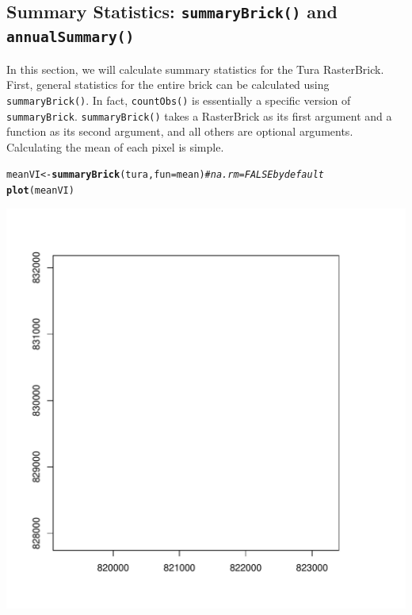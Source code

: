 \documentclass{article}\usepackage[]{graphicx}\usepackage[]{color}
\makeatletter
\def\maxwidth{ %
  \ifdim\Gin@nat@width>\linewidth
    \linewidth
  \else
    \Gin@nat@width
  \fi
}
\newcommand{\hlcom}[1]{\textcolor[rgb]{0.678,0.584,0.686}{\textit{#1}}}%
\newcommand{\hlstd}[1]{\textcolor[rgb]{0.345,0.345,0.345}{#1}}%
\newcommand{\hlkwb}[1]{\textcolor[rgb]{0.69,0.353,0.396}{#1}}%
\newcommand{\hlkwc}[1]{\textcolor[rgb]{0.333,0.667,0.333}{#1}}%
\newcommand{\hlkwd}[1]{\textcolor[rgb]{0.737,0.353,0.396}{\textbf{#1}}}%
\newenvironment{kframe}{%
 \def\at@end@of@kframe{}%
 \ifinner\ifhmode%
  \def\at@end@of@kframe{\end{minipage}}%
  \begin{minipage}{\columnwidth}%
 \fi\fi%
 \def\FrameCommand##1{\hskip\@totalleftmargin \hskip-\fboxsep
 \colorbox{shadecolor}{##1}\hskip-\fboxsep
     \hskip-\linewidth \hskip-\@totalleftmargin \hskip\columnwidth}%
 \MakeFramed {\advance\hsize-\width
   \@totalleftmargin\z@ \linewidth\hsize
   \@setminipage}}%
 {\par\unskip\endMakeFramed%
 \at@end@of@kframe}
\newenvironment{knitrout}{}{} %
\def\code#1{\texttt{#1}}
\makeatother
\begin{document}
\subsection{Summary Statistics: \code{summaryBrick()} and \code{annualSummary()}}

In this section, we will calculate summary statistics for the Tura RasterBrick. First, general statistics for the entire brick can be calculated using \code{summaryBrick()}. In fact, \code{countObs()} is essentially a specific version of \code{summaryBrick}. \code{summaryBrick()} takes a RasterBrick as its first argument and a function as its second argument, and all others are optional arguments. Calculating the mean of each pixel is simple.

\begin{knitrout}
\color{fgcolor}\begin{kframe}
\begin{alltt}
\hlstd{meanVI} \hlkwb{<-} \hlkwd{summaryBrick}\hlstd{(tura,} \hlkwc{fun} \hlstd{= mean)}  \hlcom{# na.rm=FALSE by default}
\hlkwd{plot}\hlstd{(meanVI)}
\end{alltt}
\end{kframe}
\includegraphics[width=\maxwidth]{figure/summaryBrick-functions} 

\end{knitrout}
\end{document}

